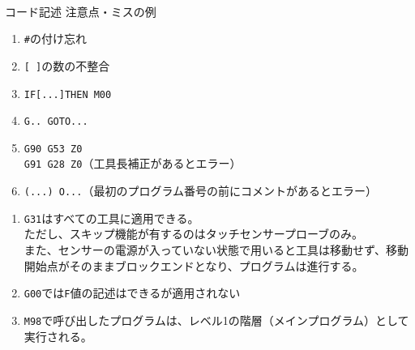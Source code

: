 \begin{appendices}
\clearpage
~\vfill
\begin{Column}{コード記述 注意点・ミスの例}
\begin{enumerate}
\item \verb|#|\hx の付け忘れ
\item \verb|[ ]|の数の不整合
\item \verb|IF[...]THEN M00|
\item \verb|G.. GOTO...|
\item \verb|G90 G53 Z0|\\
      \verb|G91 G28 Z0|（工具長補正があるとエラー）
\item \verb|(...) O...|（最初のプログラム番号の前にコメントがあるとエラー）
\end{enumerate}
\tcbline*
\begin{enumerate}
\item
\verb|G31|はすべての工具に適用できる。\\
ただし、スキップ機能が有するのはタッチセンサープローブのみ。\\
また、センサーの電源が入っていない状態で用いると工具は移動せず、移動開始点がそのままブロックエンドとなり、プログラムは進行する。
\item \verb|G00|では\verb|F|値の記述はできるが適用されない
\item \verb|M98|で呼び出したプログラムは、レベル1の階層（メインプログラム）として実行される。
\end{enumerate}
\end{Column}


\end{appendices}
